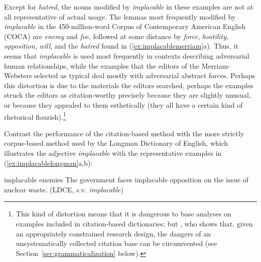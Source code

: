 Except for \textit{hatred}, the nouns  modified by \textit{implacable} in these examples are not at all representative  of actual usage. The lemmas  most frequently modified by \textit{implacable} in the 450\hyp{}million\hyp{}word Corpus of Contemporary American English (COCA) are \textit{enemy} and \textit{foe}, followed at some distance by \textit{force}, \textit{hostility}, \textit{opposition}, \textit{will}, and the \textit{hatred} found in (\ref{ex:implacablemerriam}a). Thus, it seems that \textit{implacable} is used most frequently in contexts describing adversarial human relationships, while the examples that the editors of the Merriam\hyp{}Websters selected as typical deal mostly with adversarial abstract forces. Perhaps this distortion is due to the materials the editors searched, perhaps the examples struck the editors as citation\hyp{}worthy precisely because they are slightly unusual, or because they appealed to them esthetically (they all have a certain kind of rhetorical flourish).\footnote{This kind of distortion means that it is dangerous to base analyses on examples included in citation\hyp{}based dictionaries;  but \citet[cf.][]{lindquist_corpus_2004-1}, who shows that, given an appropriately constrained research design,  the dangers of an unsystematically collected citation base can be circumvented (see Section~\ref{sec:grammaticalization} below).}

Contrast the performance of the citation\hyp{}based method with the more strictly corpus\hyp{}based method used by the Longman Dictionary  of English, which illustrates the adjective  \textit{implacable} with the representative  examples in (\ref{ex:implacablelongman}a,b):

\begin{exe}
\ex
\begin{xlist}
\label{ex:implacablelongman}
\ex implacable enemies
\ex The government faces implacable opposition on the issue of nuclear waste. (LDCE, s.v. \textit{implacable})
\end{xlist}
\end{exe}\largerpage


